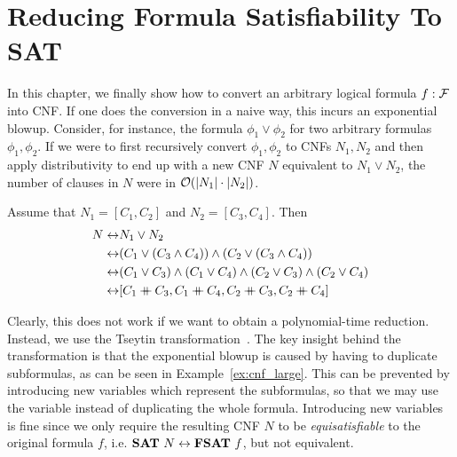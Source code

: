
\chapter{Reducing Formula Satisfiability To SAT}\label{chap:fsat_sat}
In this chapter, we finally show how to convert an arbitrary logical formula $f : \mathcal{F}$ into CNF. 
If one does the conversion in a naive way, this incurs an exponential blowup. Consider, for instance, the formula $\phi_1 \lor \phi_2$ for two arbitrary formulas $\phi_1, \phi_2$. If we were to first recursively convert $\phi_1, \phi_2$ to CNFs $N_1, N_2$ and then apply distributivity to end up with a new CNF $N$ equivalent to $N_1 \lor N_2$, the number of clauses in $N$ were in $\mathcal{O}{(|N_1| \cdot |N_2|)}$. 
\begin{example}\label{ex:cnf_large}
  Assume that $N_1 = [C_1, C_2]$ and $N_2 = [C_3, C_4]$. Then
  \begin{align*}
    N \leftrightarrow & N_1 \lor N_2 \\
    \leftrightarrow & (C_1 \lor (C_3 \land C_4)) \land (C_2 \lor (C_3 \land C_4)) \\
    \leftrightarrow & (C_1 \lor C_3) \land (C_1 \lor C_4) \land (C_2 \lor C_3) \land (C_2 \lor C_4) \\
    \leftrightarrow & [C_1 \concat C_3, C_1 \concat C_4, C_2 \concat C_3, C_2 \concat C_4]
  \end{align*}
\end{example}

Clearly, this does not work if we want to obtain a polynomial-time reduction. Instead, we use the Tseytin transformation~\cite{Tseitin1983}. The key insight behind the transformation is that the exponential blowup is caused by having to duplicate subformulas, as can be seen in Example~\ref{ex:cnf_large}. This can be prevented by introducing new variables which represent the subformulas, so that we may use the variable instead of duplicating the whole formula.
Introducing new variables is fine since we only require the resulting CNF $N$ to be \textit{equisatisfiable} to the original formula $f$, i.e. $\textbf{SAT}{}~N \leftrightarrow \textbf{FSAT}{}~f$, but not equivalent.  

